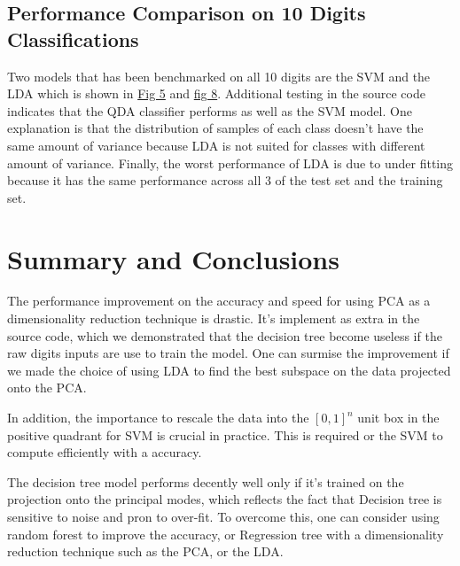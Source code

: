 \documentclass{article}
\begin{document}
    \subsection{Performance Comparison on 10 Digits Classifications}
        Two models that has been benchmarked on all 10 digits are the SVM and the LDA which is shown in \hyperref[fig:figure5]{Fig 5} and \hyperref[fig:figure8]{fig 8}.  Additional testing in the source code indicates that the QDA classifier performs as well as the SVM model. One explanation is that the distribution of samples of each class doesn't have the same amount of variance because LDA is not suited for classes with different amount of variance. Finally, the worst performance of LDA is due to under fitting because it has the same performance across all 3 of the test set and the training set. 

\section{Summary and Conclusions}
        \hspace{1.1em}
        The performance improvement on the accuracy and speed for using PCA as a dimensionality reduction technique is drastic. It's implement as extra in the source code, which we demonstrated that the decision tree become useless if the raw digits inputs are use to train the model. One can surmise the improvement if we made the choice of using LDA to find the best subspace on the data projected onto the PCA.  
        \par
        In addition, the importance to rescale the data into the $[0, 1]^n$ unit box in the positive quadrant for SVM is crucial in practice. This is required or the SVM to compute efficiently with a accuracy. 
        \par
        The decision tree model performs decently well only if it's trained on the projection onto the principal modes, which reflects the fact that Decision tree is sensitive to noise and pron to over-fit. To overcome this, one can consider using random forest to improve the accuracy, or Regression tree with a dimensionality reduction technique such as the PCA, or the LDA. 
   
\printbibliography
\end{document}
